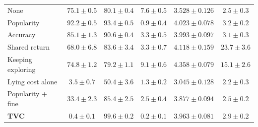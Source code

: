 \begin{table}[t]
\begin{tabular}{lccccc}
    None & $75.1 \pm 0.5$ & $80.1 \pm 0.4$ & $7.6 \pm 0.5$ & $3.528 \pm 0.126$ & $2.5 \pm 0.3$ \\
    Popularity & $92.2 \pm 0.5$ & $93.4 \pm 0.5$ & $0.9 \pm 0.4$ & $4.023 \pm 0.078$ & $3.2 \pm 0.2$ \\
    Accuracy & $85.1 \pm 1.3$ & $90.6 \pm 0.4$ & $3.3 \pm 0.5$ & $3.993 \pm 0.097$ & $3.1 \pm 0.3$ \\
    Shared return & $68.0 \pm 6.8$ & $83.6 \pm 3.4$ & $3.3 \pm 0.7$ & $4.118 \pm 0.159$ & $\mathbf{23.7 \pm 3.6}$ \\
    Keeping exploring & $74.8 \pm 1.2$ & $79.2 \pm 1.1$ & $9.1 \pm 0.6$ & $\mathbf{4.358 \pm 0.079}$ & $15.1 \pm 2.6$ \\
    Lying cost alone & $3.5 \pm 0.7$ & $50.4 \pm 3.6$ & $1.3 \pm 0.2$ & $3.045 \pm 0.128$ & $2.2 \pm 0.3$ \\
    Popularity + fine & $33.4 \pm 2.3$ & $85.4 \pm 2.5$ & $2.5 \pm 0.4$ & $3.877 \pm 0.094$ & $2.5 \pm 0.2$ \\
    \textbf{TVC} & $\mathbf{0.4 \pm 0.1}$ & $\mathbf{99.6 \pm 0.2}$ & $\mathbf{0.2 \pm 0.1}$ & $3.963 \pm 0.081$ & $2.9 \pm 0.2$ \\
    \bottomrule
  \end{tabular}
\end{table}
